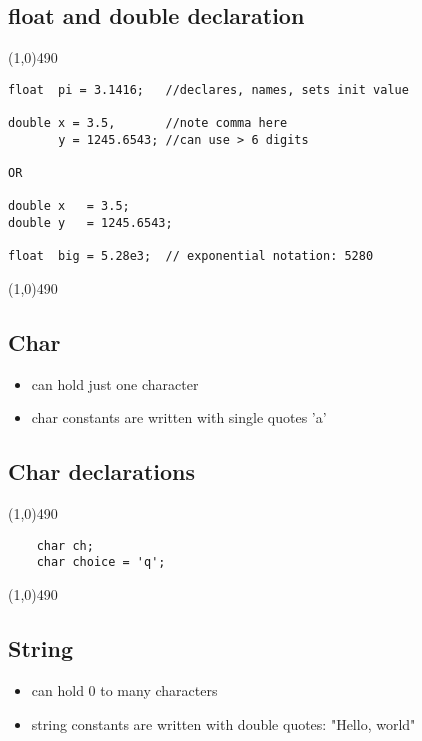 \documentclass{report}
\begin{document}
        
        \bigbreak \noindent 
        \subsection{float and double declaration}
        \bigbreak \noindent 
\line(1,0){490}
        \begin{verbatim}
float  pi = 3.1416;   //declares, names, sets init value

double x = 3.5,	      //note comma here
       y = 1245.6543; //can use > 6 digits

OR

double x   = 3.5;
double y   = 1245.6543;

float  big = 5.28e3;  // exponential notation: 5280
        \end{verbatim}
\line(1,0){490}


        \bigbreak \noindent \bigbreak \noindent 
        \subsection{Char}
        \bigbreak \noindent 
        \begin{itemize}
            \item can hold just one character
            \item char constants are written with single quotes 'a'
        \end{itemize}

        \bigbreak \noindent 
        \subsection{Char declarations}
        \bigbreak \noindent 
    \line(1,0){490}
    \begin{verbatim}
    char ch;
    char choice = 'q';
    \end{verbatim}
    \line(1,0){490}

    \bigbreak \noindent 
    \subsection{String}
    \bigbreak \noindent 
    \begin{itemize}
        \item can hold 0 to many characters
        \item string constants are written with double quotes:  "Hello, world"
    \end{itemize}

    \bigbreak \noindent 
\end{document}
